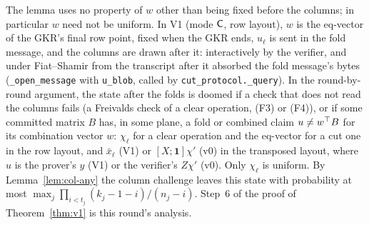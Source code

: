 The lemma uses no property of $w$ other than
being fixed before the columns; in particular $w$ need not be uniform. In V1 (mode $\mathsf{C}$, row
layout), $w$ is the eq-vector of the GKR's final row point, fixed when the GKR ends, $u_\ell$ is sent
in the fold message, and the columns are drawn after it: interactively by the verifier, and under
Fiat--Shamir from the transcript after it absorbed the fold message's bytes
(\texttt{\_open\_message} with \texttt{u\_blob}, called by \texttt{cut\_protocol.\_query}). In the
round-by-round argument, the state after the folds is doomed if a check that does not read the
columns fails (a Freivalds check of a clear operation, (F3) or (F4)), or if some committed matrix
$B$ has, in some plane, a fold or combined claim
$u\neq w^\top B$ for its combination vector $w$: $\chi_\ell$ for a clear operation and the eq-vector
for a cut one in the row layout, and $\bar x_\ell$ (V1) or $[X;\mathbf 1]\chi'$ (v0) in the
transposed layout, where $u$ is the prover's $y$ (V1) or the verifier's $Z\chi'$ (v0). Only
$\chi_\ell$ is uniform. By
Lemma~\ref{lem:col-any} the column challenge leaves this state with probability at most
$\max_j\prod_{i<t_j}(k_j-1-i)/(n_j-i)$. Step~6 of the proof of Theorem~\ref{thm:v1} is this round's
analysis.

